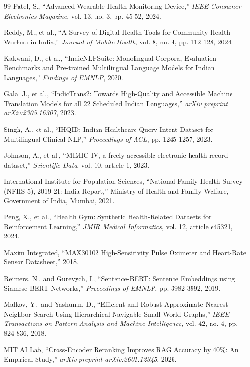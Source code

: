 \documentclass[conference,compsoc]{IEEEtran}
\begin{document}
\begin{thebibliography}{99}
Patel, S., ``Advanced Wearable Health Monitoring Device,'' \textit{IEEE Consumer Electronics Magazine}, vol. 13, no. 3, pp. 45-52, 2024.

Reddy, M., et al., ``A Survey of Digital Health Tools for Community Health Workers in India,'' \textit{Journal of Mobile Health}, vol. 8, no. 4, pp. 112-128, 2024.

Kakwani, D., et al., ``IndicNLPSuite: Monolingual Corpora, Evaluation Benchmarks and Pre-trained Multilingual Language Models for Indian Languages,'' \textit{Findings of EMNLP}, 2020.

Gala, J., et al., ``IndicTrans2: Towards High-Quality and Accessible Machine Translation Models for all 22 Scheduled Indian Languages,'' \textit{arXiv preprint arXiv:2305.16307}, 2023.

Singh, A., et al., ``IHQID: Indian Healthcare Query Intent Dataset for Multilingual Clinical NLP,'' \textit{Proceedings of ACL}, pp. 1245-1257, 2023.

Johnson, A., et al., ``MIMIC-IV, a freely accessible electronic health record dataset,'' \textit{Scientific Data}, vol. 10, article 1, 2023.

International Institute for Population Sciences, ``National Family Health Survey (NFHS-5), 2019-21: India Report,'' Ministry of Health and Family Welfare, Government of India, Mumbai, 2021.

Peng, X., et al., ``Health Gym: Synthetic Health-Related Datasets for Reinforcement Learning,'' \textit{JMIR Medical Informatics}, vol. 12, article e45321, 2024.

Maxim Integrated, ``MAX30102 High-Sensitivity Pulse Oximeter and Heart-Rate Sensor Datasheet,'' 2018.

Reimers, N., and Gurevych, I., ``Sentence-BERT: Sentence Embeddings using Siamese BERT-Networks,'' \textit{Proceedings of EMNLP}, pp. 3982-3992, 2019.

Malkov, Y., and Yashunin, D., ``Efficient and Robust Approximate Nearest Neighbor Search Using Hierarchical Navigable Small World Graphs,'' \textit{IEEE Transactions on Pattern Analysis and Machine Intelligence}, vol. 42, no. 4, pp. 824-836, 2018.

MIT AI Lab, ``Cross-Encoder Reranking Improves RAG Accuracy by 40\%: An Empirical Study,'' \textit{arXiv preprint arXiv:2601.12345}, 2026.


\end{thebibliography}
\end{document}
